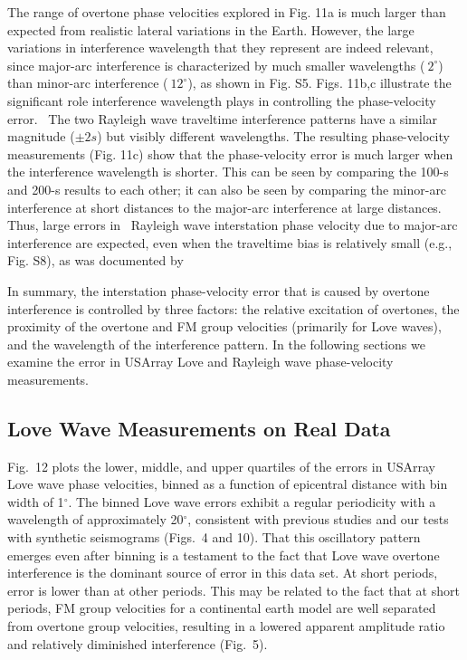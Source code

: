 \documentclass[extra,mreferee]{gji}
\begin{document}
The range of overtone phase velocities explored in Fig. 11a is much larger than expected from realistic lateral variations in the Earth. However, the large variations in interference wavelength that they represent are indeed relevant, since major-arc interference is characterized by much smaller wavelengths ($~2^\circ$) than minor-arc interference ($~12^\circ$), as shown in Fig. S5. Figs. 11b,c illustrate the significant role interference wavelength plays in controlling the phase-velocity error.  The two Rayleigh wave traveltime interference patterns have a similar magnitude ($\pm 2 s$) but visibly different wavelengths. The resulting phase-velocity measurements (Fig. 11c) show that the phase-velocity error is much larger when the interference wavelength is shorter. This can be seen by comparing the 100-s and 200-s results to each other; it can also be seen by comparing the minor-arc interference at short distances to the major-arc interference at large distances. Thus, large errors in  Rayleigh wave interstation phase velocity due to major-arc interference are expected, even when the traveltime bias is relatively small (e.g., Fig. S8), as was documented by \citet{hariharan2020evidence}

In summary, the interstation phase-velocity error that is caused by overtone interference is controlled by three factors: the relative excitation of overtones, the proximity of the overtone and FM group velocities (primarily for Love waves), and the wavelength of the interference pattern. In the following sections we examine the error in USArray Love and Rayleigh wave phase-velocity measurements.


\subsection{Love Wave Measurements on Real Data}
Fig.\ 12 plots the lower, middle, and upper quartiles of the errors in USArray Love wave phase velocities, binned as a function of epicentral distance with bin width of 1$^\circ$. The binned Love wave errors exhibit a regular periodicity with a wavelength of approximately 20$^\circ$, consistent with previous studies \citep{foster2014overtone} and our tests with synthetic seismograms (Figs.\ 4 and 10). That this oscillatory pattern emerges even after binning is a testament to the fact that Love wave overtone interference is the dominant source of error in this data set. At short periods, error is lower than at other periods. This may be related to the fact that at short periods, FM group velocities for a continental earth model are well separated from overtone group velocities, resulting in a lowered apparent amplitude ratio and relatively diminished interference (Fig.\ 5).
\end{document}
